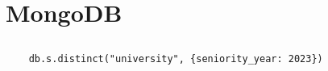 \section{MongoDB}

\subsection{}
\begin{verbatim}
	db.s.distinct("university", {seniority_year: 2023})
\end{verbatim}

\subsection{}

\subsection{}

\subsection{}
